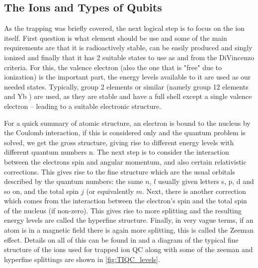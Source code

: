 \subsection{The Ions and Types of Qubits}\label{sec:trapqbit}
As the trapping was briefly covered, the next logical step is to focus on the ion itself.
First question is what element should be use and some of the main requirements are that it is radioactively stable, can be easily produced and singly ionized and finally that it has 2 suitable states to use as \kz and \ko from the DiVincenzo criteria.
For this, the valence electron (also the one that is "free" due to ionization) is the important part, the energy levels available to it are used as our needed states.
Typically, group 2 elements or similar (namely group 12 elements and Yb \cite{ozeriTrappedionQubitTool2011}) are used, as they are stable and have a full shell except a single valence electron -- leading to a suitable electronic structure.

For a quick summary of atomic structure, an electron is bound to the nucleus by the Coulomb interaction, if this is considered only and the quantum problem is solved, we get the gross structure, giving rise to different energy levels with different quantum numbers n.
The next step is to consider the interaction between the electrons spin and angular momentum, and also certain relativistic corrections.
This gives rise to the fine structure which are the usual orbitals described by the quantum numbers: the same $n$, $l$ usually given letters s, p, d and so on, and the total spin $j$ (or equivalently $m$.
Next, there is another correction which comes from the interaction between the electron's spin and the total spin of the nucleus (if non-zero).
This gives rise to more splitting and the resulting energy levels are called the hyperfine structure.
Finally, in very vague terms, if an atom is in a magnetic field there is again more splitting, this is called the Zeeman effect.
Details on all of this can be found in \cite{woodgateELEMENTARYATOMICSTRUCTURE1970} and a diagram of the typical fine structure of the ions used for trapped ion QC along with some of the zeeman and hyperfine splittings are shown in \cref{fig:TIQC_levels}.


